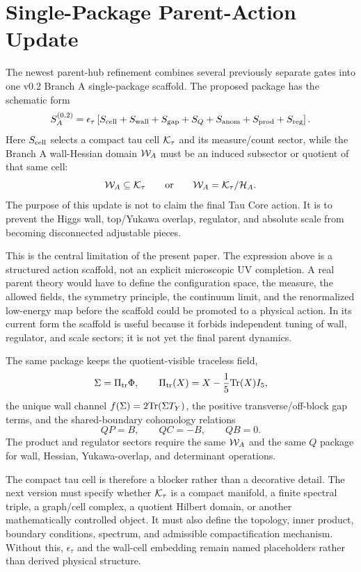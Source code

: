 \documentclass[11pt]{article}
\begin{document}
\section{Single-Package Parent-Action Update}
The newest parent-hub refinement combines several previously separate gates
into one v0.2 Branch A single-package scaffold.  The proposed package has the
schematic form
\begin{equation}
S_A^{(0.2)}=
\epsilon_\tau\left[
S_{\rm cell}
+S_{\rm wall}
+S_{\rm gap}
+S_Q
+S_{\rm anom}
+S_{\rm prod}
+S_{\rm reg}
\right].
\end{equation}
Here $S_{\rm cell}$ selects a compact tau cell ${\cal K}_\tau$ and its
measure/count sector, while the Branch A wall-Hessian domain ${\cal W}_A$ must
be an induced subsector or quotient of that same cell:
\begin{equation}
{\cal W}_A\subseteq{\cal K}_\tau
\qquad\hbox{or}\qquad
{\cal W}_A={\cal K}_\tau/{\cal H}_A .
\end{equation}
The purpose of this update is not to claim the final Tau Core action.  It is
to prevent the Higgs wall, top/Yukawa overlap, regulator, and absolute scale
from becoming disconnected adjustable pieces.

This is the central limitation of the present paper.  The expression above is
a structured action scaffold, not an explicit microscopic UV completion.  A
real parent theory would have to define the configuration space, the measure,
the allowed fields, the symmetry principle, the continuum limit, and the
renormalized low-energy map before the scaffold could be promoted to a
physical action.  In its current form the scaffold is useful because it
forbids independent tuning of wall, regulator, and scale sectors; it is not yet
the final parent dynamics.

The same package keeps the quotient-visible traceless field,
\begin{equation}
\Sigma=\Pi_{\rm tr}\Phi,\qquad
\Pi_{\rm tr}(X)=X-\frac15{\rm Tr}(X)I_5,
\end{equation}
the unique wall channel $f(\Sigma)=2{\rm Tr}(\Sigma T_Y)$, the positive
transverse/off-block gap terms, and the shared-boundary cohomology relations
\begin{equation}
QP=B,\qquad QC=-B,\qquad QB=0 .
\end{equation}
The product and regulator sectors require the same ${\cal W}_A$ and the same
$Q$ package for wall, Hessian, Yukawa-overlap, and determinant operations.

The compact tau cell is therefore a blocker rather than a decorative detail.
The next version must specify whether ${\cal K}_\tau$ is a compact
manifold, a finite spectral triple, a graph/cell complex, a quotient Hilbert
domain, or another mathematically controlled object.  It must also define the
topology, inner product, boundary conditions, spectrum, and admissible
compactification mechanism.  Without this, $\epsilon_\tau$ and the wall-cell
embedding remain named placeholders rather than derived physical structure.
\end{document}
